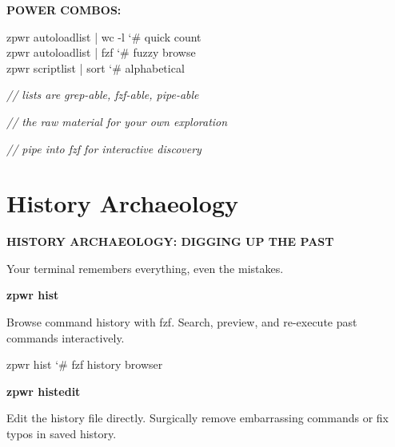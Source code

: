\documentclass[11pt,a4paper,twoside]{book}
\begin{document}
\vspace{12pt}
{\bfseries\color{neonyellow} POWER COMBOS:}\vspace{4pt}

\begin{codebox}
\color{neongreen}zpwr autoloadlist | wc -l    {\char`\#} quick count\\
\color{neongreen}zpwr autoloadlist | fzf      {\char`\#} fuzzy browse\\
\color{neongreen}zpwr scriptlist | sort       {\char`\#} alphabetical\\
\end{codebox}

{\small\itshape\color{dimtext} // lists are grep-able, fzf-able, pipe-able}

{\small\itshape\color{dimtext} // the raw material for your own exploration}

{\small\itshape\color{dimtext} // pipe into fzf for interactive discovery}


\vspace{16pt}

\section{History Archaeology}


\vspace{10pt}
{\large\bfseries\color{neoncyan} HISTORY ARCHAEOLOGY: DIGGING UP THE PAST}\vspace{6pt}

Your terminal remembers everything, even the mistakes.


\vspace{12pt}
{\bfseries\color{neonyellow} zpwr hist}\vspace{4pt}

Browse command history with fzf. Search, preview, and re-execute past commands interactively.

\begin{codebox}
\color{neongreen}zpwr hist                   {\char`\#} fzf history browser\\
\end{codebox}


\vspace{12pt}
{\bfseries\color{neonyellow} zpwr histedit}\vspace{4pt}

Edit the history file directly. Surgically remove embarrassing commands or fix typos in saved history.
\end{document}
